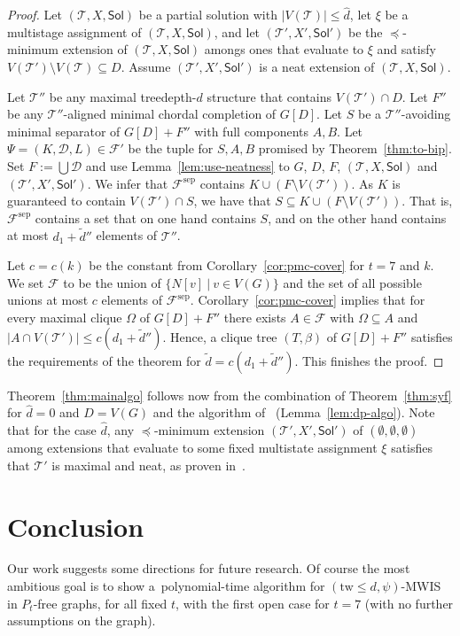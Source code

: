 \documentclass[11pt,a4paper]{article}
\theoremstyle{definition}
\def\T{\mathcal{T}}
\def\Sol{\mathsf{Sol}}
\begin{document}
\begin{proof}
Let $(\T,X,\Sol)$ be a partial solution with $|V(\T)| \leq \widehat{d}$,
let $\xi$ be a multistage assignment of $(\T,X,\Sol)$, and let 
$(\T',X',\Sol')$ be the $\preceq$-minimum extension of $(\T,X,\Sol)$ 
amongs ones that 
evaluate to $\xi$ and satisfy $V(\T') \setminus V(\T) \subseteq D$. 
Assume $(\T',X',\Sol')$ is a neat extension of $(\T,X,\Sol)$. 

Let $\T''$ be any maximal treedepth-$d$ structure that contains
$V(\T') \cap D$. Let $F''$ be any $\T''$-aligned minimal chordal
completion of $G[D]$. Let $S$ be a $\T''$-avoiding
minimal separator of $G[D]+F''$ with full components $A,B$. 
Let $\Psi = (K,\mathcal{D},L) \in \mathcal{F}'$ be the tuple
for $S,A,B$ promised by Theorem~\ref{thm:to-bip}. 
Set $F := \bigcup\mathcal{D}$ and use Lemma~\ref{lem:use-neatness}
to $G$, $D$, $F$, $(\T,X,\Sol)$ and $(\T',X',\Sol')$. 
We infer that $\mathcal{F}^\mathrm{sep}$ contains 
$K \cup (F \setminus V(\T'))$. As $K$ is guaranteed to contain $V(\T') \cap S$,
  we have that $S \subseteq K \cup (F \setminus V(\T'))$. 
That is, $\mathcal{F}^\mathrm{sep}$ contains a set that on one hand
contains $S$, and on the other hand contains at most $d_1 + \widetilde{d}''$
elements of $\T''$. 

Let $c = c(k)$ be the constant from Corollary~\ref{cor:pmc-cover} for $t=7$ and $k$. 
We set $\mathcal{F}$ to be the union of $\{N[v]~|~v \in V(G)\}$
and the set of all possible unions at most $c$ elements of $\mathcal{F}^\mathrm{sep}$.
Corollary~\ref{cor:pmc-cover} implies that for every
maximal clique $\Omega$ of $G[D]+F''$ there exists $A \in \mathcal{F}$
with $\Omega \subseteq A$ and $|A \cap V(\T')| \leq c(d_1+\widetilde{d}'')$. 
Hence, a clique tree $(T,\beta)$ of $G[D]+F''$ satisfies the requirements
of the theorem for $\widetilde{d} = c(d_1+\widetilde{d}'')$. 
This finishes the proof.
\end{proof}

Theorem~\ref{thm:mainalgo} follows now from the combination
of Theorem~\ref{thm:syf} for $\widehat{d} = 0$ and $D = V(G)$
and the algorithm of~\cite[Section~3]{DBLP:conf/soda/ChudnovskyMPPR24} (Lemma~\ref{lem:dp-algo}).
Note that for the case $\widehat{d}$, 
any $\preceq$-minimum extension $(\T',X',\Sol')$ of $(\emptyset,\emptyset,\emptyset)$
among extensions that evaluate to some fixed multistate assignment $\xi$ satisfies that $\T'$ is maximal and
neat, as proven in~\cite{DBLP:conf/soda/ChudnovskyMPPR24}.



\section{Conclusion}
Our work suggests some directions for future research.
Of course the most ambitious goal is to show a~polynomial-time algorithm for 
$(\mathrm{tw} \leq d,\psi)$-MWIS in $P_t$-free graphs, for all fixed $t$,
with the first open case for $t=7$ (with no further assumptions on the graph).
\end{document}
